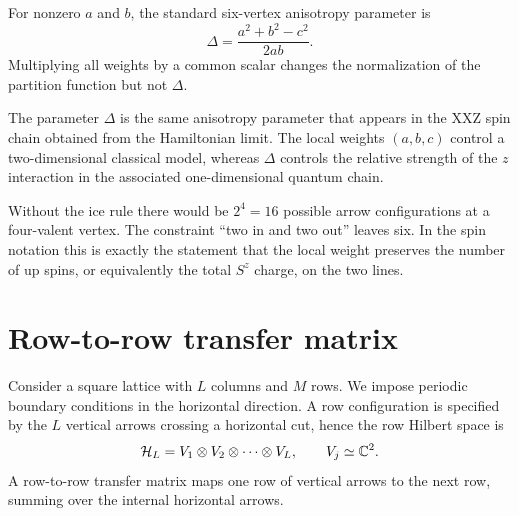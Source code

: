 \begin{definition}
For nonzero $a$ and $b$, the standard six-vertex anisotropy parameter is
\begin{equation}
\label{eq:six-vertex-Delta-from-abc}
    \Delta
    =
    \frac{a^2+b^2-c^2}{2ab} .
\end{equation}
Multiplying all weights by a common scalar changes the normalization of the
partition function but not $\Delta$.
\end{definition}

The parameter $\Delta$ is the same anisotropy parameter that appears in the XXZ
spin chain obtained from the Hamiltonian limit.  The local weights $(a,b,c)$
control a two-dimensional classical model, whereas $\Delta$ controls the relative
strength of the $z$ interaction in the associated one-dimensional quantum chain.

\begin{remark}
Without the ice rule there would be $2^4=16$ possible arrow configurations at a
four-valent vertex.  The constraint ``two in and two out'' leaves six.  In the
spin notation this is exactly the statement that the local weight preserves the
number of up spins, or equivalently the total $S^z$ charge, on the two lines.
\end{remark}

\section{Row-to-row transfer matrix}
\label{sec:six-vertex-row-transfer-matrix}

Consider a square lattice with $L$ columns and $M$ rows.  We impose periodic
boundary conditions in the horizontal direction.  A row configuration is specified
by the $L$ vertical arrows crossing a horizontal cut, hence the row Hilbert space
is
\begin{equation}
\label{eq:six-vertex-row-space}
    \mathcal{H}_L=V_1\otimes V_2\otimes\cdots\otimes V_L,
    \qquad
    V_j\simeq\mathbb{C}^2 .
\end{equation}
A row-to-row transfer matrix maps one row of vertical arrows to the next row,
summing over the internal horizontal arrows.

